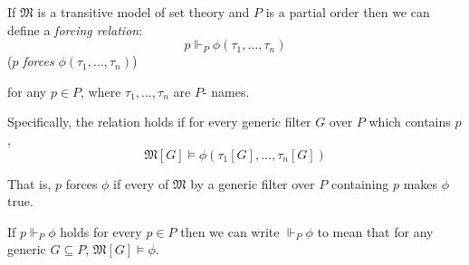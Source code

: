 \documentclass[12pt]{article}
\begin{document}
If $\mathfrak{M}$ is a transitive model of set theory and $P$ is a partial order then we can define a \emph{forcing relation}:
$$p\Vdash_P \phi(\tau_1,\ldots,\tau_n)$$
($p$ \emph{forces} $\phi(\tau_1,\ldots,\tau_n)$)

for any $p\in P$, where $\tau_1,\ldots,\tau_n$ are $P$- names.

Specifically, the relation holds if for every generic filter $G$ over $P$ which contains $p$, $$\mathfrak{M}[G]\vDash \phi(\tau_1[G],\ldots,\tau_n[G])$$

That is, $p$ forces $\phi$ if every  of $\mathfrak{M}$ by a generic filter over $P$ containing $p$ makes $\phi$ true.

If $p\Vdash_P \phi$ holds for every $p\in P$ then we can write $\Vdash_P\phi$ to mean that for any generic $G\subseteq P$, $\mathfrak{M}[G]\vDash\phi$.
\end{document}
